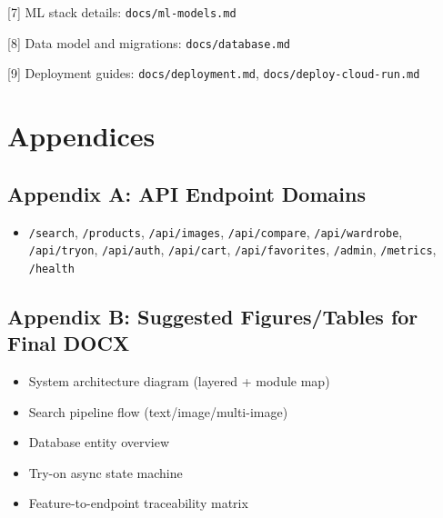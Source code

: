 \documentclass[12pt,a4paper]{report}
\begin{document}
[7] ML stack details: \texttt{docs/ml-models.md}

[8] Data model and migrations: \texttt{docs/database.md}

[9] Deployment guides: \texttt{docs/deployment.md}, \texttt{docs/deploy-cloud-run.md}


\chapter{Appendices}
\section{Appendix A: API Endpoint Domains}
\begin{itemize}
\item \texttt{/search}, \texttt{/products}, \texttt{/api/images}, \texttt{/api/compare}, \texttt{/api/wardrobe}, \texttt{/api/tryon}, \texttt{/api/auth}, \texttt{/api/cart}, \texttt{/api/favorites}, \texttt{/admin}, \texttt{/metrics}, \texttt{/health}
\end{itemize}

\section{Appendix B: Suggested Figures/Tables for Final DOCX}
\begin{itemize}
\item System architecture diagram (layered + module map)
\item Search pipeline flow (text/image/multi-image)
\item Database entity overview
\item Try-on async state machine
\item Feature-to-endpoint traceability matrix
\end{itemize}
\end{document}
